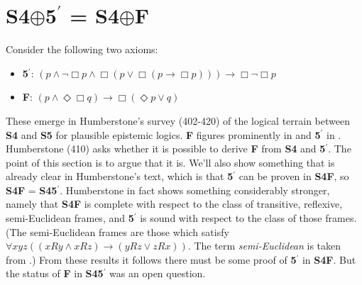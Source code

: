  \section {\textbf{S4}$\oplus$\textbf{5}$^\prime$ = \textbf{S4}$\oplus$\textbf{F}}
Consider the following two axioms:
\begin{itemize}[label={}]
\item{\textbf{5}$^\prime$\!: $(p \wedge \neg \Box p \wedge \Box (p \vee \Box (p \rightarrow \Box p))) \rightarrow \Box \neg \Box p$ }
\item{\textbf{F}: $(p\wedge \Diamond\Box q) \rightarrow \Box (\Diamond p\vee q)$}
\end{itemize}
These emerge in Humberstone's survey (402-420) of the logical terrain between \textbf{S4} and \textbf{S5} for plausible epistemic logics. \textbf{F} figures prominently in \citet{Stalnaker2006-STAOLO} and \textbf{5}$^\prime$ in \citet{Voorbraak.1991}. Humberstone (410) asks whether it is possible to derive \textbf{F} from \textbf{S4} and \textbf{5}$^\prime$. The point of this section is to argue that it is. We'll also show something that is already clear in Humberstone's text, which is that \textbf{5}$^\prime$ can be proven in \textbf{S4F}, so \textbf{S4F} = \textbf{S45}$^\prime$. Humberstone in fact shows something considerably stronger, namely that \textbf{S4F} is complete with respect to the class of transitive, reflexive, semi-Euclidean frames, and \textbf{5}$^\prime$ is sound with respect to the class of those frames. (The semi-Euclidean frames are those which satisfy 
$\forall xyz((xRy \wedge xRz) \rightarrow (yRz \vee zRx))$. The term \textit{semi-Euclidean} is taken from \citet{Voorbraak.1991}.) From these results it follows there must be some proof of \textbf{5}$^\prime$ in \textbf{S4F}. But the status of \textbf{F} in \textbf{S45}$^\prime$ was an open question. 

